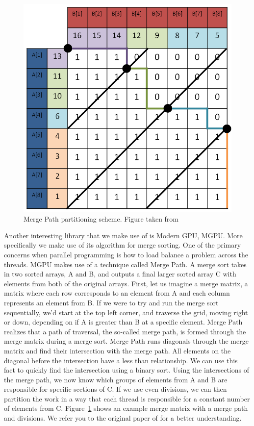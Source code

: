 \begin{figure}[ht!]
\centering
\includegraphics[width=1.0\textwidth]{images/MergePath.png}
\caption{Merge Path partitioning scheme. Figure taken from \cite{odeh2012merge}}
\label{fig:mgpu}
\end{figure}

Another interesting library that we make use of is Modern GPU, MGPU.
More specifically we make use of its algorithm for merge sorting.
One of the primary concerns when parallel programming is how to load balance a problem across the threads.
MGPU makes use of a technique called Merge Path.
A merge sort takes in two sorted arrays, A and B, and outputs a final larger sorted array C with elements from both of the original arrays.
First, let us imagine a merge matrix, a matrix where each row corresponds to an element from A and each column represents an element from B.
If we were to try and run the merge sort sequentially, we'd start at the top left corner, and traverse the grid, moving right or down, depending on if A is greater than B at a specific element.
Merge Path realizes that a path of traversal, the so-called merge path, is formed through the merge matrix during a merge sort.
Merge Path runs diagonals through the merge matrix and find their intersection with the merge path.
All elements on the diagonal before the intersection have a less than relationship.
We can use this fact to quickly find the intersection using a binary sort.
Using the intersections of the merge path, we now know which groups of elements from A and B are responsible for specific sections of C.
If we use even divisions, we can then partition the work in a way that each thread is responsible for a constant number of elements from C.
Figure~\ref{fig:mgpu} shows an example merge matrix with a merge path and divisions.
We refer you to the original paper of \cite{odeh2012merge} for a better understanding.

